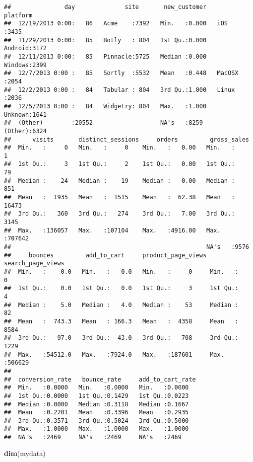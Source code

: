 \documentclass[]{article}
\newenvironment{Shaded}{\begin{snugshade}}{\end{snugshade}}
\newcommand{\KeywordTok}[1]{\textcolor[rgb]{0.13,0.29,0.53}{\textbf{{#1}}}}
\newcommand{\NormalTok}[1]{{#1}}
\begin{document}
\begin{verbatim}
##               day              site       new_customer      platform   
##  12/19/2013 0:00:   86   Acme    :7392   Min.   :0.000   iOS    :3435  
##  11/29/2013 0:00:   85   Botly   : 804   1st Qu.:0.000   Android:3172  
##  12/11/2013 0:00:   85   Pinnacle:5725   Median :0.000   Windows:2399  
##  12/7/2013 0:00 :   85   Sortly  :5532   Mean   :0.448   MacOSX :2054  
##  12/2/2013 0:00 :   84   Tabular : 804   3rd Qu.:1.000   Linux  :2036  
##  12/5/2013 0:00 :   84   Widgetry: 804   Max.   :1.000   Unknown:1641  
##  (Other)        :20552                   NA's   :8259    (Other):6324  
##      visits       distinct_sessions     orders         gross_sales    
##  Min.   :     0   Min.   :     0    Min.   :   0.00   Min.   :     1  
##  1st Qu.:     3   1st Qu.:     2    1st Qu.:   0.00   1st Qu.:    79  
##  Median :    24   Median :    19    Median :   0.00   Median :   851  
##  Mean   :  1935   Mean   :  1515    Mean   :  62.38   Mean   : 16473  
##  3rd Qu.:   360   3rd Qu.:   274    3rd Qu.:   7.00   3rd Qu.:  3145  
##  Max.   :136057   Max.   :107104    Max.   :4916.00   Max.   :707642  
##                                                       NA's   :9576    
##     bounces         add_to_cart     product_page_views search_page_views
##  Min.   :    0.0   Min.   :   0.0   Min.   :     0     Min.   :     0   
##  1st Qu.:    0.0   1st Qu.:   0.0   1st Qu.:     3     1st Qu.:     4   
##  Median :    5.0   Median :   4.0   Median :    53     Median :    82   
##  Mean   :  743.3   Mean   : 166.3   Mean   :  4358     Mean   :  8584   
##  3rd Qu.:   97.0   3rd Qu.:  43.0   3rd Qu.:   708     3rd Qu.:  1229   
##  Max.   :54512.0   Max.   :7924.0   Max.   :187601     Max.   :506629   
##                                                                         
##  conversion_rate   bounce_rate     add_to_cart_rate
##  Min.   :0.0000   Min.   :0.0000   Min.   :0.0000  
##  1st Qu.:0.0000   1st Qu.:0.1429   1st Qu.:0.0223  
##  Median :0.0000   Median :0.3118   Median :0.1667  
##  Mean   :0.2201   Mean   :0.3396   Mean   :0.2935  
##  3rd Qu.:0.3571   3rd Qu.:0.5024   3rd Qu.:0.5000  
##  Max.   :1.0000   Max.   :1.0000   Max.   :1.0000  
##  NA's   :2469     NA's   :2469     NA's   :2469
\end{verbatim}

\begin{Shaded}
\begin{Highlighting}[]
\KeywordTok{dim}\NormalTok{(mydata)}
\end{Highlighting}
\end{Shaded}
\end{document}
